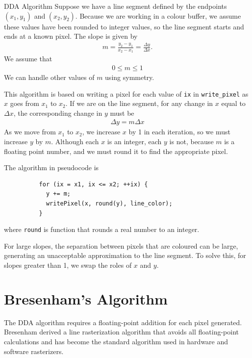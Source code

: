 \documentclass[../COS3712_Notes.tex]{subfiles}
\begin{document}
      \begin{definition}{DDA Algorithm}
        Suppose we have a line segment defined by the endpoints $(x_1, y_1)$ and $(x_2, y_2)$.
        Because we are working in a colour buffer, we assume these values have been rounded
        to integer values, so the line segment starts and ends at a known pixel.
        The slope is given by
        \begin{align*}
          m = \frac{y_2 - y_1}{x_2 - x_1} = \frac{\Delta y}{\Delta x}.
        \end{align*}
        We assume that
        \begin{align*}
          0 \leq m \leq 1
        \end{align*}
        We can handle other values of $m$ using symmetry.

        This algorithm is based on writing a pixel for each value of \texttt{ix} in
        \texttt{write\_pixel} as $x$ goes from $x_1$ to $x_2$.
        If we are on the line segment, for any change in $x$ equal to $\Delta x$,
        the corresponding change in $y$ must be
        \begin{align*}
          \Delta y = m \Delta x
        \end{align*}
        As we move from $x_1$ to $x_2$, we increase $x$ by 1 in each iteration,
        so we must increase $y$ by $m$.
        Although each $x$ is an integer, each $y$ is not, because $m$ is a floating point number,
        and we must round it to find the appropriate pixel.

        The algorithm in pseudocode is
        \begin{verbatim}
          for (ix = x1, ix <= x2; ++ix) {
            y += m;
            writePixel(x, round(y), line_color);
          }
        \end{verbatim}
        where \texttt{round} is function that rounds a real number to an integer.

        For large slopes, the separation between pixels that are coloured can be large,
        generating an unacceptable approximation to the line segment.
        To solve this, for slopes greater than 1, we swap the roles of $x$ and $y$.
      \end{definition}

    \section{Bresenham's Algorithm}
      The DDA algorithm requires a floating-point addition for each pixel generated.
      Bresenham derived a line rasterization algorithm that avoids all floating-point calculations
      and has become the standard algorithm used in hardware and software rasterizers.
\end{document}

